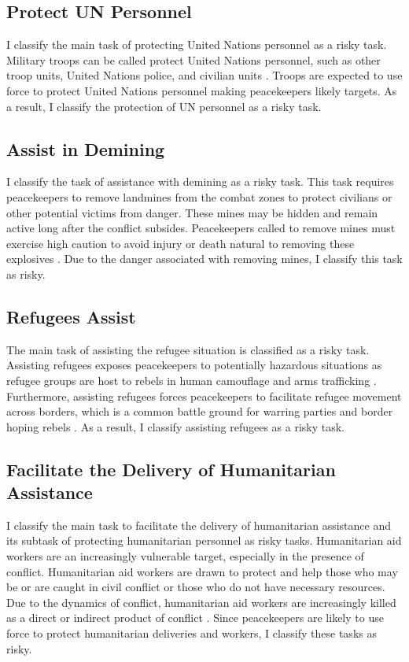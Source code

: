 \subsection*{Protect UN Personnel}

I classify the main task of protecting United Nations personnel as a risky task. Military troops can be called protect United Nations personnel, such as other troop units, United Nations police, and civilian units \citep{Infantry_2012}. Troops are expected to use force to protect United Nations personnel making peacekeepers likely targets. As a result, I classify the protection of UN personnel as a risky task. 

\subsection*{Assist in Demining}

I classify the task of assistance with demining as a risky task. This task requires peacekeepers to remove landmines from the combat zones to protect civilians or other potential victims from danger. These mines may be hidden and remain active long after the conflict subsides. Peacekeepers called to remove mines must exercise high caution to avoid injury or death natural to removing these explosives \citep{demining}. Due to the danger associated with removing mines, I classify this task as risky. 

\subsection*{Refugees Assist}

The main task of assisting the refugee situation is classified as a risky task. Assisting refugees exposes peacekeepers to potentially hazardous situations as refugee groups are host to rebels in human camouflage and arms trafficking \citep{beardsley2011}. Furthermore, assisting refugees forces peacekeepers to facilitate refugee movement across borders, which is a common battle ground for warring parties and border hoping rebels \citep{townsen2014}. As a result, I classify assisting refugees as a risky task. 

\subsection*{Facilitate the Delivery of Humanitarian Assistance}

I classify the main task to facilitate the delivery of humanitarian assistance and its subtask of protecting humanitarian personnel as risky tasks. Humanitarian aid workers are an increasingly vulnerable target, especially in the presence of conflict. Humanitarian aid workers are drawn to protect and help those who may be or are caught in civil conflict or those who do not have necessary resources. Due to the dynamics of conflict, humanitarian aid workers are increasingly killed as a direct or indirect product of conflict \citep{hoelscher2017conflict}. Since peacekeepers are likely to use force to protect humanitarian deliveries and workers, I classify these tasks as risky. 

